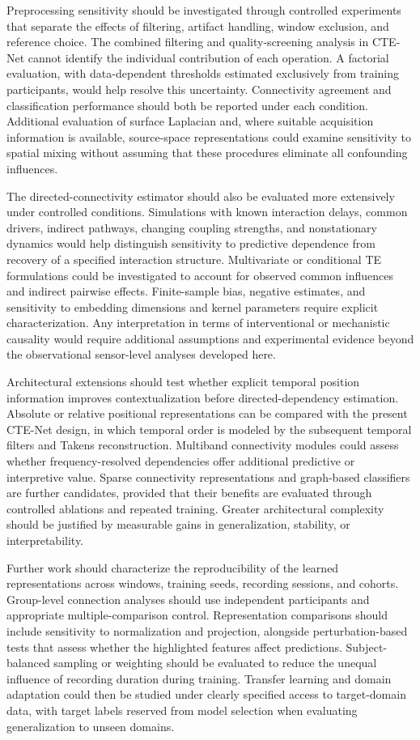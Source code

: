 Preprocessing sensitivity should be investigated through controlled experiments that separate the effects of filtering, artifact handling, window exclusion, and reference choice. The combined filtering and quality-screening analysis in CTE-Net cannot identify the individual contribution of each operation. A factorial evaluation, with data-dependent thresholds estimated exclusively from training participants, would help resolve this uncertainty. Connectivity agreement and classification performance should both be reported under each condition. Additional evaluation of surface Laplacian and, where suitable acquisition information is available, source-space representations could examine sensitivity to spatial mixing without assuming that these procedures eliminate all confounding influences.

The directed-connectivity estimator should also be evaluated more extensively under controlled conditions. Simulations with known interaction delays, common drivers, indirect pathways, changing coupling strengths, and nonstationary dynamics would help distinguish sensitivity to predictive dependence from recovery of a specified interaction structure. Multivariate or conditional TE formulations could be investigated to account for observed common influences and indirect pairwise effects. Finite-sample bias, negative estimates, and sensitivity to embedding dimensions and kernel parameters require explicit characterization. Any interpretation in terms of interventional or mechanistic causality would require additional assumptions and experimental evidence beyond the observational sensor-level analyses developed here.

Architectural extensions should test whether explicit temporal position information improves contextualization before directed-dependency estimation. Absolute or relative positional representations can be compared with the present CTE-Net design, in which temporal order is modeled by the subsequent temporal filters and Takens reconstruction. Multiband connectivity modules could assess whether frequency-resolved dependencies offer additional predictive or interpretive value. Sparse connectivity representations and graph-based classifiers are further candidates, provided that their benefits are evaluated through controlled ablations and repeated training. Greater architectural complexity should be justified by measurable gains in generalization, stability, or interpretability.

Further work should characterize the reproducibility of the learned representations across windows, training seeds, recording sessions, and cohorts. Group-level connection analyses should use independent participants and appropriate multiple-comparison control. Representation comparisons should include sensitivity to normalization and projection, alongside perturbation-based tests that assess whether the highlighted features affect predictions. Subject-balanced sampling or weighting should be evaluated to reduce the unequal influence of recording duration during training. Transfer learning and domain adaptation could then be studied under clearly specified access to target-domain data, with target labels reserved from model selection when evaluating generalization to unseen domains.

